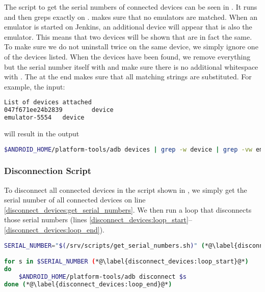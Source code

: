 The script to get the serial numbers of connected devices can be seen in . It runs  and then {grep}s exactly on .  makes sure that no emulators are matched. When an emulator is started on Jenkins, an additional device will appear that is also the emulator. This means that two devices will be shown that are in fact the same. To make sure we do not uninstall twice on the same device, we simply ignore one of the devices listed. When the devices have been found, we remove everything but the serial number itself with  and make sure there is no additional whitespace with . The  at the end makes sure that all matching strings are substituted. For example, the input:
\begin{lstlisting}[language=bash]
List of devices attached
047f671ee24b2839        device
emulator-5554   device
\end{lstlisting}
will result in the output 

\begin{lstlisting}[language=bash,caption=Script that gets the serial numbers of all connected devices,label=lst:get_serial_numbers]
$ANDROID_HOME/platform-tools/adb devices | grep -w device | grep -vw emulator | sed 's/\s*device//' | sed 's/\s*//g'
\end{lstlisting}
\subsubsection{Disconnection Script}
To disconnect all connected devices in the script shown in , we simply get the serial number of all connected devices on line \ref{disconnect_devices:get_serial_numbers}. We then run a loop that disconnects those serial numbers (lines \ref{disconnect_devices:loop_start}--\ref{disconnect_devices:loop_end}).
\begin{lstlisting}[language=bash,caption=Script that disconnects all connected devices,label=lst:disconnect_devices]
SERIAL_NUMBER="$(/srv/scripts/get_serial_numbers.sh)" (*@\label{disconnect_devices:get_serial_numbers}@*)

for s in $SERIAL_NUMBER (*@\label{disconnect_devices:loop_start}@*)
do
    $ANDROID_HOME/platform-tools/adb disconnect $s
done (*@\label{disconnect_devices:loop_end}@*)
\end{lstlisting}

